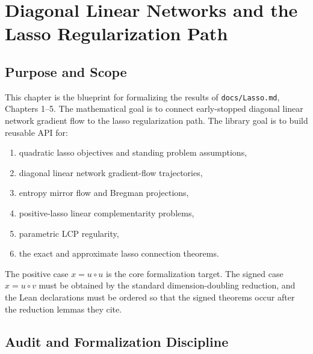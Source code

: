 \chapter{Diagonal Linear Networks and the Lasso Regularization Path}

\section{Purpose and Scope}

This chapter is the blueprint for formalizing the results of
\texttt{docs/Lasso.md}, Chapters 1--5.
The mathematical goal is to connect early-stopped diagonal linear network
gradient flow to the lasso regularization path.
The library goal is to build reusable API for:
\begin{enumerate}
  \item quadratic lasso objectives and standing problem assumptions,
  \item diagonal linear network gradient-flow trajectories,
  \item entropy mirror flow and Bregman projections,
  \item positive-lasso linear complementarity problems,
  \item parametric LCP regularity,
  \item the exact and approximate lasso connection theorems.
\end{enumerate}

The positive case $x = u \circ u$ is the core formalization target.
The signed case $x = u \circ v$ must be obtained by the standard
dimension-doubling reduction, and the Lean declarations must be ordered so that
the signed theorems occur after the reduction lemmas they cite.

\section{Audit and Formalization Discipline}

